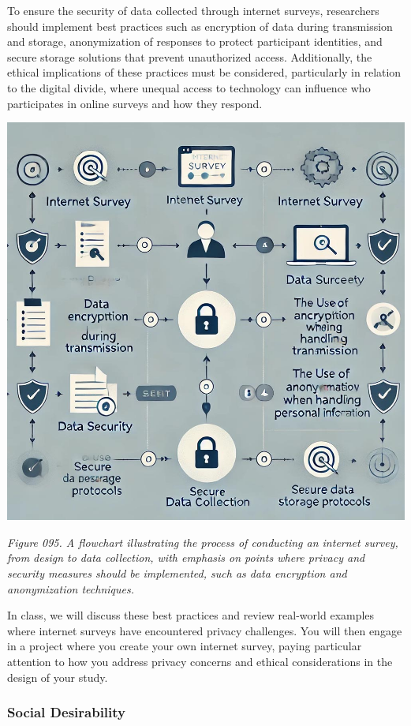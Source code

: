 \documentclass[
]{book}
\begin{document}
To ensure the security of data collected through internet surveys, researchers should implement best practices such as encryption of data during transmission and storage, anonymization of responses to protect participant identities, and secure storage solutions that prevent unauthorized access. Additionally, the ethical implications of these practices must be considered, particularly in relation to the digital divide, where unequal access to technology can influence who participates in online surveys and how they respond.

\includegraphics[width=1\linewidth,height=\textheight,keepaspectratio]{images/fig095.jpg}

\emph{Figure 095. A flowchart illustrating the process of conducting an internet survey, from design to data collection, with emphasis on points where privacy and security measures should be implemented, such as data encryption and anonymization techniques.}

In class, we will discuss these best practices and review real-world examples where internet surveys have encountered privacy challenges. You will then engage in a project where you create your own internet survey, paying particular attention to how you address privacy concerns and ethical considerations in the design of your study.

\subsubsection{Social Desirability}\label{social-desirability}
\end{document}
